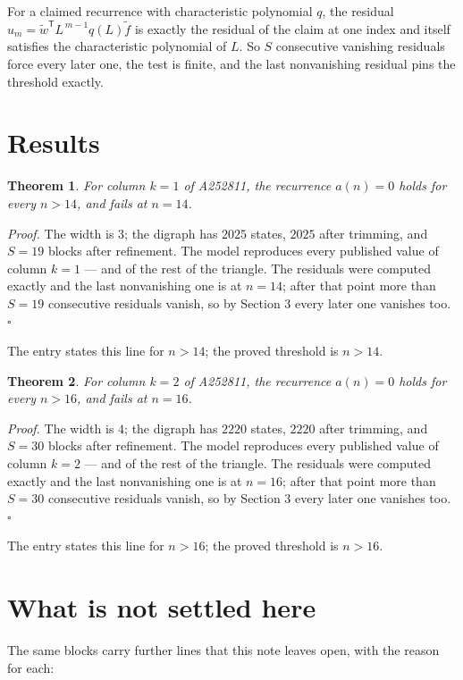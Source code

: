 \documentclass[11pt]{article}
\newtheorem{theorem}{Theorem}
\theoremstyle{definition}
\begin{document}
For a claimed recurrence with characteristic polynomial $q$, the residual $u_m = \tilde w^{\mathsf T}L^{\,m-1}q(L)\tilde f$ is exactly the residual of the claim at one index and itself satisfies the characteristic polynomial of $L$. So $S$ consecutive vanishing residuals force every later one, the test is finite, and the last nonvanishing residual pins the threshold exactly.

\section{Results}

\begin{theorem} For column $k = 1$ of A252811, the recurrence $a(n) = 0$ holds for every $n > 14$, and fails at $n = 14$.\end{theorem}

{\itshape Proof.} The width is $3$; the digraph has $2025$ states, $2025$ after trimming, and $S = 19$ blocks after refinement. The model reproduces every published value of column $k = 1$ --- and of the rest of the triangle. The residuals were computed exactly and the last nonvanishing one is at $n = 14$; after that point more than $S = 19$ consecutive residuals vanish, so by Section 3 every later one vanishes too. $\square$

The entry states this line for $n > 14$; the proved threshold is $n > 14$.

\begin{theorem} For column $k = 2$ of A252811, the recurrence $a(n) = 0$ holds for every $n > 16$, and fails at $n = 16$.\end{theorem}

{\itshape Proof.} The width is $4$; the digraph has $2220$ states, $2220$ after trimming, and $S = 30$ blocks after refinement. The model reproduces every published value of column $k = 2$ --- and of the rest of the triangle. The residuals were computed exactly and the last nonvanishing one is at $n = 16$; after that point more than $S = 30$ consecutive residuals vanish, so by Section 3 every later one vanishes too. $\square$

The entry states this line for $n > 16$; the proved threshold is $n > 16$.

\section{What is not settled here}

The same blocks carry further lines that this note leaves open, with the reason for each:
\end{document}
